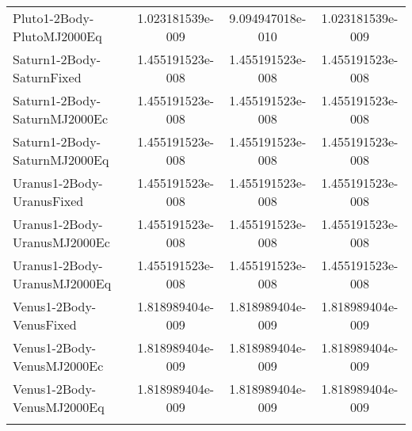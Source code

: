 \begin{table}[htbp!]
\begin{tabular}{lccc}
         Pluto1-2Body-PlutoMJ2000Eq & 1.023181539e-009 & 9.094947018e-010 & 1.023181539e-009 \\
         Saturn1-2Body-SaturnFixed & 1.455191523e-008 & 1.455191523e-008 & 1.455191523e-008 \\
         Saturn1-2Body-SaturnMJ2000Ec & 1.455191523e-008 & 1.455191523e-008 & 1.455191523e-008 \\
         Saturn1-2Body-SaturnMJ2000Eq & 1.455191523e-008 & 1.455191523e-008 & 1.455191523e-008 \\
         Uranus1-2Body-UranusFixed & 1.455191523e-008 & 1.455191523e-008 & 1.455191523e-008 \\
         Uranus1-2Body-UranusMJ2000Ec & 1.455191523e-008 & 1.455191523e-008 & 1.455191523e-008 \\
         Uranus1-2Body-UranusMJ2000Eq & 1.455191523e-008 & 1.455191523e-008 & 1.455191523e-008 \\
         Venus1-2Body-VenusFixed & 1.818989404e-009 & 1.818989404e-009 & 1.818989404e-009 \\
         Venus1-2Body-VenusMJ2000Ec & 1.818989404e-009 & 1.818989404e-009 & 1.818989404e-009 \\
         Venus1-2Body-VenusMJ2000Eq & 1.818989404e-009 & 1.818989404e-009 & 1.818989404e-009 \\
      \hline\hline
      \label{Table: WinGMAT-LinuxGMAT CS Parameters Set 1} 
\end{tabular}
\end{table}
